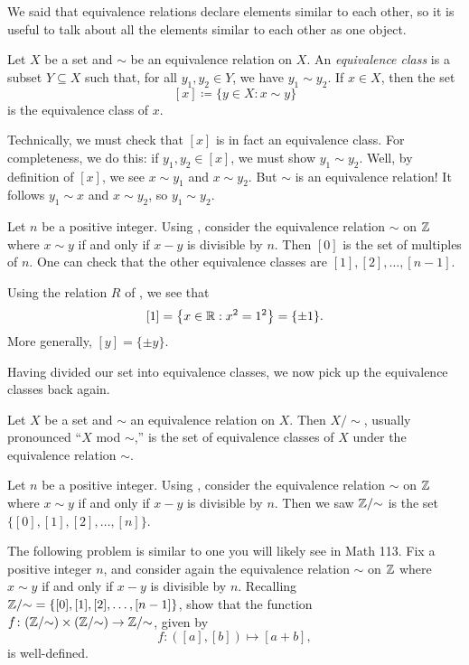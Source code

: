 \documentclass[../notes.tex]{subfiles}
\begin{document}
We said that equivalence relations declare elements similar to each other, so it is useful to talk about all the elements similar to each other as one object.
\begin{definition}
    Let $X$ be a set and $\sim$ be an equivalence relation on $X$. An \emph{equivalence class} is a subset $Y\subseteq X$ such that, for all $y_1, y_2 \in Y$, we have $y_1 \sim y_2$. If $x \in X$, then the set
    \[[x] \coloneqq \{y \in X : x \sim y\}\]
    is the equivalence class of $x$.
\end{definition}
\begin{remark}
    Technically, we must check that $[x]$ is in fact an equivalence class. For completeness, we do this: if $y_1,y_2\in[x]$, we must show $y_1\sim y_2$. Well, by definition of $[x]$, we see $x\sim y_1$ and $x\sim y_2$. But $\sim$ is an equivalence relation! It follows $y_1\sim x$ and $x\sim y_2$, so $y_1\sim y_2$.
\end{remark}
\begin{example}
    Let $n$ be a positive integer. Using , consider the equivalence relation $\sim$ on $\mathbb Z$ where $x \sim y$ if and only if $x-y$ is divisible by $n$. Then $[0]$ is the set of multiples of $n$. One can check that the other equivalence classes are $[1], [2], \ldots, [n - 1]$.
\end{example}
\begin{example}
    Using the relation $R$ of , we see that
    \[[1]=\left\{x\in\mathbb R:x^2=1^2\right\}=\{\pm1\}.\]
    More generally, $[y]=\{\pm y\}$.
\end{example}
Having divided our set into equivalence classes, we now pick up the equivalence classes back again.
\begin{definition}
    Let $X$ be a set and $\sim$ an equivalence relation on $X$. Then $X / {\sim}$, usually pronounced ``$X$ mod $\sim$,'' is the set of equivalence classes of $X$ under the equivalence relation $\sim$.
\end{definition}
\begin{example}
    Let $n$ be a positive integer. Using , consider the equivalence relation $\sim$ on $\mathbb Z$ where $x \sim y$ if and only if $x-y$ is divisible by $n$. Then we saw $\mathbb Z /{\sim}$ is the set $\{[0], [1], [2], \dotsc, [n]\}$.
\end{example}
\begin{exercise}
    The following problem is similar to one you will likely see in Math 113. Fix a positive integer $n$, and consider again the equivalence relation $\sim$ on $\mathbb Z$ where $x \sim y$ if and only if $x-y$ is divisible by $n$. Recalling $\mathbb Z/{\sim}=\{[0], [1], [2], \dotsc, [n - 1]\}$, show that the function $f\colon (\mathbb Z /{\sim}) \times (\mathbb Z /{\sim}) \to \mathbb Z /{\sim}$, given by
    \[f\colon([a], [b]) \mapsto [a + b],\]
    is well-defined.
\end{exercise}
\end{document}
